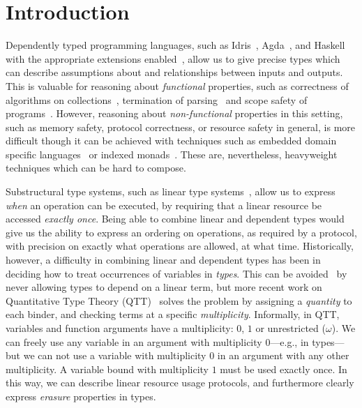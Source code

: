 \section{Introduction}

Dependently typed programming languages, such as Idris~\cite{idris-jfp},
Agda~\cite{norell2007thesis}, and Haskell with the appropriate extensions 
enabled~\cite{dephaskell}, allow us to give precise types which can
describe assumptions about and relationships between inputs and outputs.
This is valuable for reasoning about \emph{functional} properties, such as
correctness of algorithms on collections~\cite{McBride2014}, termination of
parsing~\cite{Danielsson2010} and 
scope safety of programs~\cite{allais-cpp17}.
However, reasoning about \emph{non-functional} properties in this setting,
such as memory safety, protocol correctness, or resource safety in general, is
more difficult though it can be achieved with techniques such as embedded
domain specific languages~\cite{brady-tfp14} or indexed
monads~\cite{Atkey2009,McBride2011}. These are, nevertheless, heavyweight
techniques which can be hard to compose.

Substructural type systems, such as linear type
systems~\cite{wadler-linear,Morris2016,linhaskell},
allow us to express \emph{when} an operation can be executed, by requiring
that a linear resource be accessed \emph{exactly once}. Being able to
combine linear and dependent types would give us the ability to express
an ordering on operations, as required by a protocol, with precision
on exactly what operations are allowed, at what time. Historically, however,
a difficulty in combining linear and dependent types has been in deciding
how to treat occurrences of variables in \emph{types}. This can be
avoided~\cite{Krishnaswami-ldtp} by never allowing types to depend on a
linear term, but more recent work on Quantitative Type Theory 
(QTT)~\cite{qtt,nuttin} solves the problem by assigning a \emph{quantity} to
each binder, and checking terms at a specific \emph{multiplicity}. 
Informally, in QTT, variables and function arguments have a multiplicity: $0$,
$1$ or unrestricted ($\omega$). We can freely use any variable in an argument
with multiplicity $0$---e.g., in types---but we can not use a variable with
multiplicity $0$ in an argument with any other
multiplicity. A variable bound with multiplicity $1$ must be used exactly once.
In this way, we can describe linear resource usage protocols, and furthermore
clearly express \emph{erasure} properties in types.

